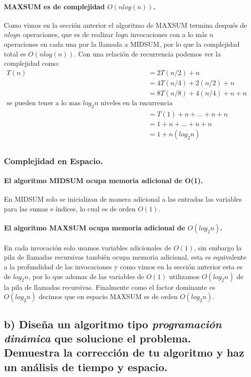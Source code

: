 \documentclass[12pt]{article}
\begin{document}
\paragraph{MAXSUM es de complejidad $O(nlog(n))$.} Como vimos en la sección anterior el algoritmo de MAXSUM termina después de $nlogn$ operaciones, que es de realizar $logn$ invocaciones con a lo más $n$ operaciones en cada una por la llamada a MIDSUM, por lo que la complejidad total es $O(nlog(n))$.
Con una relación de recurrencia podemos ver la complejidad como:
\begin{equation}
\begin{split}
T(n) & = 2T(n/2) + n \\
	& = 4T(n/4) + 2(n/2) + n \\
	& = 8T(n/8) + 4(n/4) + n + n \\
	\text{se pueden tener a lo mas $log_2n$ niveles en la recurrencia}... & \\
	& = T(1) + n + ... + n + n \\
	& = 1 + n + ... + n + n \\
	& = 1 + n(log_2n) \\
\end{split}
\end{equation}
\subsubsection{Complejidad en Espacio.}
\paragraph{El algoritmo MIDSUM ocupa memoria adicional de O(1).} En MIDSUM solo se inicializan de manera adicional a las entradas las variables para las sumas e índices, lo cual es de orden $O(1)$.
\paragraph{El algoritmo MAXSUM ocupa memoria adicional de $O(log_2n)$.} En cada invocación solo usamos variables adicionales de $O(1)$, sin embargo la pila de llamadas recursivas también ocupa memoria adicional, esta es equivalente a la profundidad de las invocaciones y como vimos en la sección anterior esta es de $log_2n$, por lo que ademas de las variables de $O(1)$ utilizamos $O(log_2n)$ de la pila de llamadas recursivas. Finalmente como el factor dominante es $O(log_2n)$ decimos que en espacio MAXSUM es de orden $O(log_2n)$.
\subsection{b) Diseña un algoritmo tipo \textit{programación dinámica} que solucione el problema. Demuestra la corrección de tu algoritmo y haz un análisis de tiempo y espacio.}
\end{document}
